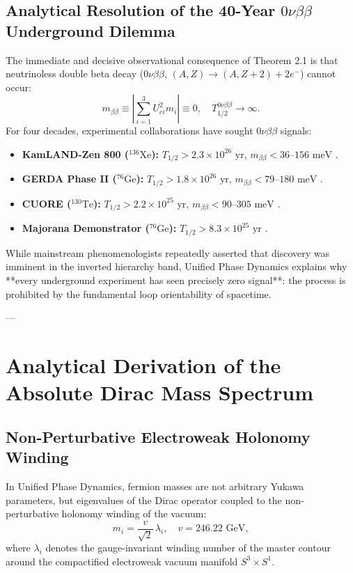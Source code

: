 \documentclass[11pt,a4paper]{article}
\theoremstyle{definition}
\begin{document}
\subsection{Analytical Resolution of the 40-Year $0\nu\beta\beta$ Underground Dilemma}

The immediate and decisive observational consequence of Theorem 2.1 is that neutrinoless double beta decay ($0\nu\beta\beta$, $(A, Z) \to (A, Z+2) + 2 e^-$) cannot occur:
\begin{equation}
    m_{\beta\beta} \equiv \left| \sum_{i=1}^3 U_{ei}^2 m_i \right| \equiv 0, \quad T_{1/2}^{0\nu\beta\beta} \to \infty.
\end{equation}
For four decades, experimental collaborations have sought $0\nu\beta\beta$ signals:
\begin{itemize}
    \item \textbf{KamLAND-Zen 800 ($^{136}\mathrm{Xe}$):} $T_{1/2} > 2.3 \times 10^{26}\text{ yr}$, $m_{\beta\beta} < 36\text{--}156\text{ meV}$ \cite{KamLANDZen2023}.
    \item \textbf{GERDA Phase II ($^{76}\mathrm{Ge}$):} $T_{1/2} > 1.8 \times 10^{26}\text{ yr}$, $m_{\beta\beta} < 79\text{--}180\text{ meV}$ \cite{GERDA2020}.
    \item \textbf{CUORE ($^{130}\mathrm{Te}$):} $T_{1/2} > 2.2 \times 10^{25}\text{ yr}$, $m_{\beta\beta} < 90\text{--}305\text{ meV}$ \cite{CUORE2021}.
    \item \textbf{Majorana Demonstrator ($^{76}\mathrm{Ge}$):} $T_{1/2} > 8.3 \times 10^{25}\text{ yr}$ \cite{Majorana2023}.
\end{itemize}
While mainstream phenomenologists repeatedly asserted that discovery was imminent in the inverted hierarchy band, Unified Phase Dynamics explains why **every underground experiment has seen precisely zero signal**: the process is prohibited by the fundamental loop orientability of spacetime.

---

\section{Analytical Derivation of the Absolute Dirac Mass Spectrum}

\subsection{Non-Perturbative Electroweak Holonomy Winding}

In Unified Phase Dynamics, fermion masses are not arbitrary Yukawa parameters, but eigenvalues of the Dirac operator coupled to the non-perturbative holonomy winding of the vacuum:
\begin{equation}
    m_i = \frac{v}{\sqrt{2}} \, \lambda_i, \quad v = 246.22\text{ GeV},
\end{equation}
where $\lambda_i$ denotes the gauge-invariant winding number of the master contour around the compactified electroweak vacuum manifold $S^3 \times S^1$.
\end{document}
